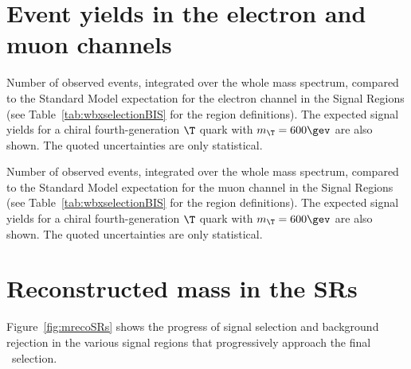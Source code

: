 \newpage

\section{Event yields in the electron and muon channels}\label{app:wbxSR_yields}


\begin{table}[h!tb]\centering
\resizebox{1.\textwidth}{!}{
        }
        \caption{
Number of observed events, integrated 
          over the whole mass spectrum, compared to the Standard Model expectation for
          the electron channel
          in the Signal Regions (see Table~\ref{tab:wbxselectionBIS} for the
        region definitions).
          The expected signal yields for a chiral 
          fourth-generation $\T$ quark with $m_{\T}=600\gev$ are also shown.
          The quoted uncertainties are only statistical.}\label{tab:cftabELE}
\end{table}


\begin{table}[h!tb]\centering
\resizebox{1.\textwidth}{!}{
        }
        \caption{Number of observed events, integrated 
          over the whole mass spectrum, compared to the Standard Model expectation for
          the muon channel 
          in the Signal Regions (see Table~\ref{tab:wbxselectionBIS} for the
        region definitions).
          The expected signal yields for a chiral 
          fourth-generation $\T$ quark with $m_{\T}=600\gev$ are also shown.
          The quoted uncertainties are only statistical.}\label{tab:cftabMUON}
\end{table}


\section{Reconstructed mass in the SRs}\label{app:wbxSR_mreco}

Figure~\ref{fig:mrecoSRs} shows the progress of signal selection
and background rejection in the various signal regions that progressively
approach the final \tight\ selection.


